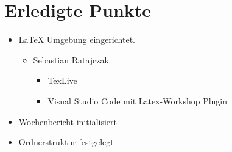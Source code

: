 \section{Erledigte Punkte}

\begin{itemize}
  \item \LaTeX{} Umgebung eingerichtet.
  \begin{itemize}
    \item Sebastian Ratajczak
    \begin{itemize}
      \item TexLive
      \item Visual Studio Code mit Latex-Workshop Plugin
    \end{itemize}
  \end{itemize}
  \item Wochenbericht initialisiert
  \item Ordnerstruktur festgelegt
\end{itemize}

